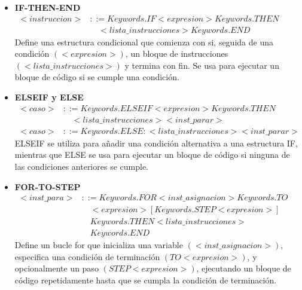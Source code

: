 \begin{itemize}
  \item \textbf{IF-THEN-END} \\
  \begin{math}
    \begin{array}{rl}
      <instruccion> & ::= Keywords.IF <expresion> Keywords.THEN \\ 
        & \quad <lista\_instrucciones> Keywords.END
    \end{array}
  \end{math} \\
  Define una estructura condicional que comienza con si, seguida de una condición $(<expresion>)$, un bloque de instrucciones $(<lista\_instrucciones>)$ y termina con fin. Se usa para ejecutar un bloque de código si se cumple una condición.
  \item \textbf{ELSEIF y ELSE} \\
  \begin{math}
    \begin{array}{rl}
      <caso> & ::= Keywords.ELSEIF <expresion> Keywords.THEN \\
        & \quad <lista\_instrucciones> <inst\_parar> \\
      <caso> & ::= Keywords.ELSE : <lista\_instrucciones> <inst\_parar>
    \end{array}
  \end{math} \\
  ELSEIF se utiliza para añadir una condición alternativa a una estructura IF, mientras que ELSE se usa para ejecutar un bloque de código si ninguna de las condiciones anteriores se cumple.
  \item \textbf{FOR-TO-STEP} \\
  \begin{math}
    \begin{array}{rl}
      <inst\_para> & ::= Keywords.FOR <inst\_asignacion> Keywords.TO \\
        & \quad <expresion> [Keywords.STEP <expresion>] \\ 
        & \quad Keywords.THEN <lista\_instrucciones> \\
        & \quad Keywords.END
    \end{array}
  \end{math} \\
  Define un bucle for que inicializa una variable $(<inst\_asignacion>)$, especifica una condición de terminación $(TO <expresion>)$, y opcionalmente un paso $(STEP <expresion>)$, ejecutando un bloque de código repetidamente hasta que se cumpla la condición de terminación.

\end{itemize}
